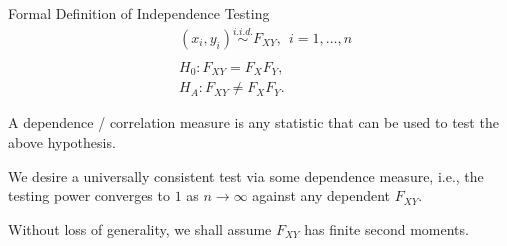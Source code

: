 \documentclass[mathserif,t]{beamer}
\begin{document}
\begin{frame}{Formal Definition of Independence Testing}
\begin{align*}
& (x_{i},y_{i}) \stackrel{i.i.d.}{\sim} F_{XY}, \ \ i=1, \ldots, n\\
& \\
& H_{0}: F_{XY}=F_{X}F_{Y},\\
& H_{A}: F_{XY} \neq F_{X}F_{Y}.
\end{align*}

\pause
\medskip
A dependence / correlation measure is any statistic that can be used to test the above hypothesis.

\pause
\medskip
We desire a universally consistent test via some dependence measure, i.e., the testing power converges to $1$ as $n \rightarrow \infty$ against any dependent $F_{XY}$.

\pause
\medskip
Without loss of generality, we shall assume $F_{XY}$ has finite second moments.


\end{frame}
\end{document}
